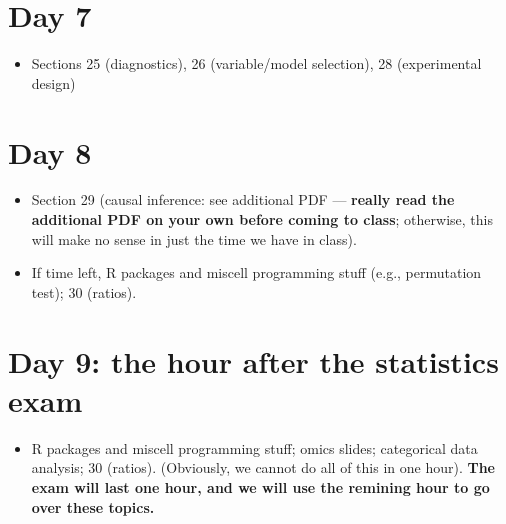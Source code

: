 \documentclass[12pt]{article}
\begin{document}
\section*{Day 7 }
\label{sec:org2142285}
\begin{itemize}
\item Sections 25 (diagnostics), 26 (variable/model selection), 28 (experimental design)
\end{itemize}
\section*{Day 8 }
\label{sec:org3d49cf0}
\begin{itemize}
\item Section 29 (causal inference: see additional PDF --- \textbf{really read the additional PDF on your own before coming to class}; otherwise, this will make no sense in just the time we have in class).
\item If time left,  R packages and miscell programming stuff (e.g., permutation test); 30 (ratios).
\end{itemize}
\section*{Day 9: the hour after the statistics exam}
\begin{itemize}
\item R packages and miscell programming stuff; omics slides; categorical data analysis; 30 (ratios). (Obviously, we cannot do all of this in one hour). \textbf{The exam will last one hour, and we will use the remining hour to go over these topics.}
\end{itemize}
\label{sec:org32ab79d}
\end{document}
